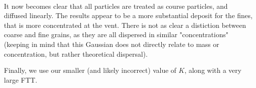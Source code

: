 \documentclass[11pt]{article}
\begin{document}
    \begin{center}
    \end{center}
    { \hspace*{\fill} \\}
    
    \begin{center}
    \end{center}
    { \hspace*{\fill} \\}
    
    \begin{center}
    \end{center}
    { \hspace*{\fill} \\}
    
    \begin{center}
    \end{center}
    { \hspace*{\fill} \\}
    
    \begin{center}
    \end{center}
    { \hspace*{\fill} \\}
    
    \begin{center}
    \end{center}
    { \hspace*{\fill} \\}
    
    It now becomes clear that all particles are treated as course particles,
and diffused linearly. The results appear to be a more substantial
deposit for the fines, that is more concentrated at the vent. There is
not as clear a distiction between coarse and fine grains, as they are
all dispersed in similar "concentrations" (keeping in mind that this
Gaussian does not directly relate to mass or concentration, but rather
theoretical dispersal).

Finally, we use our smaller (and likely incorrect) value of \(K\), along
with a very large FTT.
\end{document}
